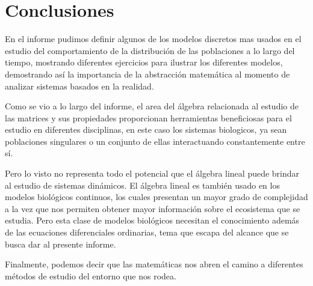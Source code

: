 \section{Conclusiones} %
\label{sec:Conclusiones}

En el informe pudimos definir algunos de los modelos discretos mas usados en el estudio del comportamiento de la distribución de las poblaciones a lo largo del tiempo, mostrando diferentes ejercicios para ilustrar los diferentes modelos, demostrando así la importancia de la abstracción matemática al momento de analizar sistemas basados en la realidad.

Como se vio a lo largo del informe, el area del álgebra relacionada al estudio de las matrices y sus propiedades proporcionan herramientas beneficiosas para el estudio en diferentes disciplinas, en este caso los sistemas biologicos, ya sean poblaciones singulares o un conjunto de ellas interactuando constantemente entre sí.

Pero lo visto no representa todo el potencial que el álgebra lineal puede brindar al estudio de sistemas dinámicos. El álgebra lineal es también usado en los modelos biológicos continuos, los cuales presentan un mayor grado de complejidad a la vez que nos permiten obtener mayor información sobre el ecosistema que se estudia. Pero esta clase de modelos biológicos necesitan el conocimiento además de las ecuaciones diferenciales ordinarias, tema que escapa del alcance que se busca dar al presente informe.

Finalmente, podemos decir que las matemáticas nos abren el camino a diferentes métodos de estudio del entorno que nos rodea.



